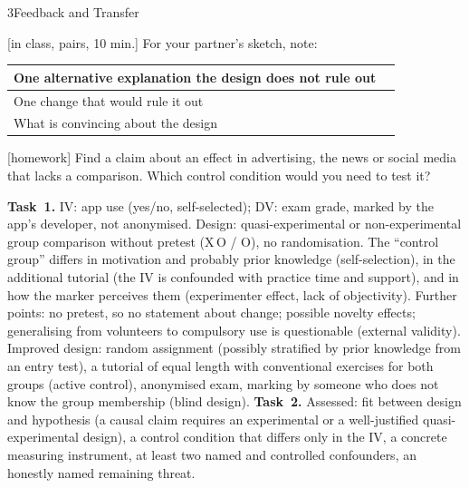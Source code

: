 \begin{uebungsblattb}{3}{Feedback and Transfer}

[in class, pairs, 10 min.]
For your partner's sketch, note:
\begin{center}
\renewcommand{\arraystretch}{2}
\begin{tabular}{|p{}|p{}|}
\hline
One alternative explanation the design does not rule out & \\ \hline
One change that would rule it out & \\ \hline
What is convincing about the design & \\ \hline
\end{tabular}
\end{center}

[homework]
Find a claim about an effect in advertising, the news or social media
that lacks a comparison. Which control condition would you need to test
it?

\begin{lehrhinweis}
\textbf{Task~1.} IV: app use (yes/no, self-selected); DV: exam grade,
marked by the app's developer, not anonymised. Design: quasi-experimental
or non-experimental group comparison without pretest
(X\,O / \phantom{X\,}O), no randomisation. The \enquote{control group}
differs in motivation and probably prior knowledge (self-selection), in
the additional tutorial (the IV is confounded with practice time and
support), and in how the marker perceives them (experimenter effect, lack
of objectivity). Further points: no pretest, so no statement about change;
possible novelty effects; generalising from volunteers to compulsory use
is questionable (external validity). Improved design: random assignment
(possibly stratified by prior knowledge from an entry test), a tutorial of
equal length with conventional exercises for both groups (active
control), anonymised exam, marking by someone who does not know the group
membership (blind design).
\textbf{Task~2.} Assessed: fit between design and hypothesis (a causal
claim requires an experimental or a well-justified quasi-experimental
design), a control condition that differs only in the IV, a concrete
measuring instrument, at least two named and controlled confounders, an
honestly named remaining threat.
\end{lehrhinweis}
\end{uebungsblattb}

